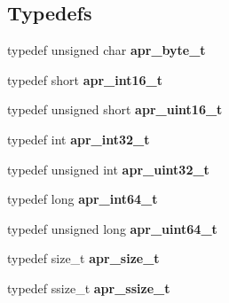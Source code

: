 \subsection*{Typedefs}
\begin{DoxyCompactItemize}
\item 
\hypertarget{group__apr__platform_gadcfa334915b4605a0052cb4ca542eb3a}{typedef unsigned char {\bfseries apr\-\_\-byte\-\_\-t}}\label{group__apr__platform_gadcfa334915b4605a0052cb4ca542eb3a}

\item 
\hypertarget{group__apr__platform_ga43c359f64f6c84d8af869539e0737df4}{typedef short {\bfseries apr\-\_\-int16\-\_\-t}}\label{group__apr__platform_ga43c359f64f6c84d8af869539e0737df4}

\item 
\hypertarget{group__apr__platform_ga3fb87c977e28a526d872d1081411b129}{typedef unsigned short {\bfseries apr\-\_\-uint16\-\_\-t}}\label{group__apr__platform_ga3fb87c977e28a526d872d1081411b129}

\item 
\hypertarget{group__apr__platform_ga21ef1e35fd3ff9be386f3cb20164ff02}{typedef int {\bfseries apr\-\_\-int32\-\_\-t}}\label{group__apr__platform_ga21ef1e35fd3ff9be386f3cb20164ff02}

\item 
\hypertarget{group__apr__platform_ga558548a135d8a816c4787250744ea147}{typedef unsigned int {\bfseries apr\-\_\-uint32\-\_\-t}}\label{group__apr__platform_ga558548a135d8a816c4787250744ea147}

\item 
\hypertarget{group__apr__platform_ga4b75afbf973dc6c8aea4ae75b044aa08}{typedef long {\bfseries apr\-\_\-int64\-\_\-t}}\label{group__apr__platform_ga4b75afbf973dc6c8aea4ae75b044aa08}

\item 
\hypertarget{group__apr__platform_ga722b277a42230f3fd41cb5be7a76cfb4}{typedef unsigned long {\bfseries apr\-\_\-uint64\-\_\-t}}\label{group__apr__platform_ga722b277a42230f3fd41cb5be7a76cfb4}

\item 
\hypertarget{group__apr__platform_gaaa72b2253f6f3032cefea5712a27540e}{typedef size\-\_\-t {\bfseries apr\-\_\-size\-\_\-t}}\label{group__apr__platform_gaaa72b2253f6f3032cefea5712a27540e}

\item 
\hypertarget{group__apr__platform_ga215ebb88932bee220b766263ebbfe6fa}{typedef ssize\-\_\-t {\bfseries apr\-\_\-ssize\-\_\-t}}\label{group__apr__platform_ga215ebb88932bee220b766263ebbfe6fa}


\end{DoxyCompactItemize}
